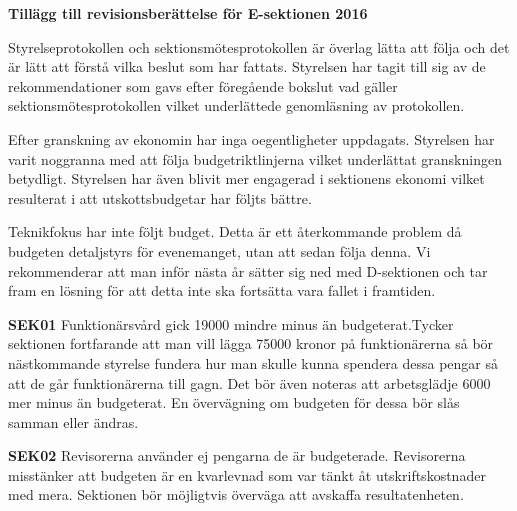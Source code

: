 \documentclass[./vt16.tex]{subfiles}
\begin{document}
\textbf{\Large{Tillägg till revisionsberättelse för E-sektionen 2016}}

Styrelseprotokollen och sektionsmötesprotokollen är överlag lätta att följa och det är lätt att förstå vilka beslut som har fattats. Styrelsen har tagit till sig av de rekommendationer som gavs efter föregående bokslut vad gäller sektionsmötesprotokollen vilket underlättede genomläsning av protokollen.

Efter granskning av ekonomin har inga oegentligheter uppdagats. Styrelsen har varit noggranna med att följa budgetriktlinjerna vilket underlättat granskningen betydligt. Styrelsen har även blivit mer engagerad i sektionens ekonomi vilket resulterat i att utskottsbudgetar har följts bättre.

Teknikfokus har inte följt budget. Detta är ett återkommande problem då budgeten detaljstyrs för 
evenemanget, utan att sedan följa denna. Vi rekommenderar att man inför nästa år sätter sig ned
med D-sektionen och tar fram en lösning för att detta inte ska fortsätta vara fallet i framtiden.

\textbf{SEK01} Funktionärsvård gick 19000 mindre minus än budgeterat.Tycker sektionen
fortfarande att man vill lägga 75000 kronor på funktionärerna så bör nästkommande styrelse fundera hur man skulle kunna spendera dessa pengar så att de går funktionärerna till gagn. Det bör även noteras att arbetsglädje 6000 mer minus än budgeterat. En övervägning om budgeten för dessa bör slås samman eller ändras. 

\textbf{SEK02} Revisorerna använder ej pengarna de är budgeterade. Revisorerna misstänker att budgeten är en kvarlevnad som var tänkt åt utskriftskostnader med mera. Sektionen bör möjligtvis överväga att avskaffa resultatenheten.
\end{document}

